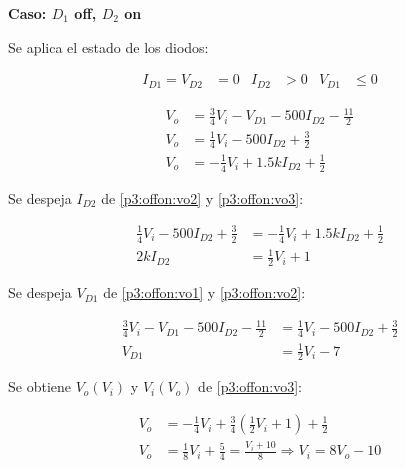 %
%
%

\bigskip

\textbf{Caso: $D_1$ off, $D_2$ on}

Se aplica el estado de los diodos:

\begin{align*}
  I_{D1} = V_{D2} &= 0
  &
  I_{D2} &> 0
  &
  V_{D1} &\leq 0
\end{align*}

\begin{align}
  V_o &=
    \frac{3}{4} V_i
    - V_{D1}
    - 500 I_{D2}
    - \frac{11}{2} \label{p3:offon:vo1}
  \\
  V_o &=
    \frac{1}{4} V_i
    - 500 I_{D2}
    + \frac{3}{2} \label{p3:offon:vo2}
  \\
  V_o &=
    - \frac{1}{4} V_i
    + 1.5k I_{D2}
    + \frac{1}{2} \label{p3:offon:vo3}
\end{align}

Se despeja $I_{D2}$ de \ref{p3:offon:vo2} y \ref{p3:offon:vo3}:

\begin{align*}
  \frac{1}{4} V_i   - 500 I_{D2}  + \frac{3}{2} &=
  - \frac{1}{4} V_i + 1.5k I_{D2} + \frac{1}{2}
  \\
  2k I_{D2} &= \frac{1}{2} V_i + 1
\end{align*}

Se despeja $V_{D1}$ de \ref{p3:offon:vo1} y \ref{p3:offon:vo2}:

\begin{align*}
  \frac{3}{4} V_i - V_{D1} - 500 I_{D2} - \frac{11}{2} &=
  \frac{1}{4} V_i          - 500 I_{D2} + \frac{3}{2}
  \\
  V_{D1} &= \frac{1}{2} V_i - 7
\end{align*}


Se obtiene $V_o(V_i)$ y $V_i(V_o)$ de \ref{p3:offon:vo3}:

\begin{align*}
  V_o &= - \frac{1}{4} V_i + \frac{3}{4} \left( \frac{1}{2} V_i + 1 \right) + \frac{1}{2}
  \\
  V_o &= \frac{1}{8} V_i + \frac{5}{4} = \frac{V_i + 10}{8} \Rightarrow V_i = 8 V_o - 10
\end{align*}

